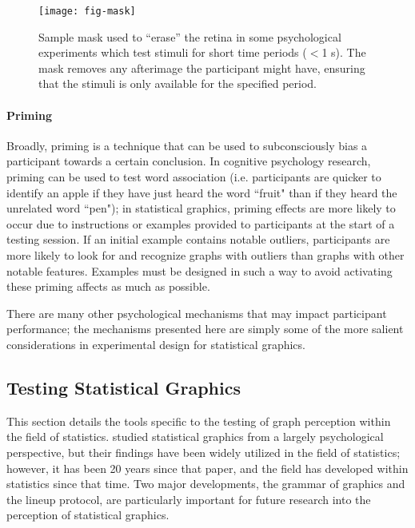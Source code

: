 \documentclass[11pt]{isuthesis}\usepackage[]{graphicx}\usepackage[]{color}
\begin{document}
\begin{figure}[htbp]\centering
\texttt{[image: fig-mask]}
\caption[Sample Image Mask]{Sample mask used to ``erase'' the retina in some psychological experiments which test stimuli for short time periods ($<$1 s). The mask removes any afterimage the participant might have, ensuring that the stimuli is only available for the specified period. }\label{fig:mask}
\end{figure}

\paragraph{Priming} Broadly, priming is a technique that can be used to subconsciously bias a participant towards a certain conclusion. In cognitive psychology research, priming can be used to test word association (i.e. participants are quicker to identify an apple if they have just heard the word ``fruit" than if they heard the unrelated word ``pen"); in statistical graphics, priming effects are more likely to occur due to instructions or examples provided to participants at the start of a testing session. If an initial example contains notable outliers, participants are more likely to look for and recognize graphs with outliers than graphs with other notable features. Examples must be designed in such a way to avoid activating these priming affects as much as possible. 

There are many other psychological mechanisms that may impact participant performance; the mechanisms presented here are simply some of the more salient considerations in experimental design for statistical graphics. 

\subsection{Testing Statistical Graphics}
This section details the tools specific to the testing of graph perception within the field of statistics. \citet{cleveland:1985} studied statistical graphics from a largely psychological perspective, but their findings have been widely utilized in the field of statistics; however, it has been 20 years since that paper, and the field has developed within statistics since that time. Two major developments, the grammar of graphics and the lineup protocol, are particularly important for future research into the perception of statistical graphics. 
\end{document}
